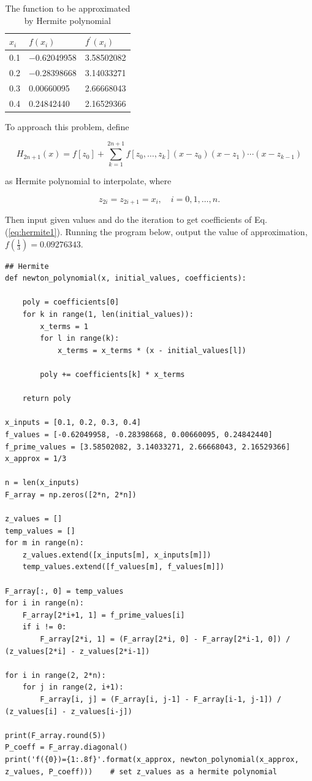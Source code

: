 \documentclass[preprint,12pt]{elsarticle}
\begin{document}
\begin{table}[h]
\centering
\begin{tabular}{l|l|l}
\textbf{$x_i$} & \textbf{$f(x_i)$} & \textbf{$f^{'}(x_i)$}\\
\hline
0.1 & −0.62049958 & 3.58502082 \\
0.2 & −0.28398668 & 3.14033271 \\
0.3 & 0.00660095 & 2.66668043 \\
0.4 & 0.24842440 & 2.16529366
\end{tabular}
\caption{The function to be approximated by Hermite polynomial}
\label{tab:hermite1}
\end{table}

To approach this problem, define 

\begin{equation}
\label{eq:hermite1}
    H_{2n+1}(x)=f[z_0]+\sum_{k=1}^{2n+1} {f[z_{0},\dots,z_{k}](x-z_0)(x-z_1)\cdots(x-z_{k-1})}
\end{equation}

as Hermite polynomial to interpolate, where

\begin{equation}
\label{eq:hermite2}
    z_{2i}=z_{2i+1}=x_i, \quad i=0,1,\dots,n.
\end{equation}

Then input given values and do the iteration to get coefficients of Eq. (\ref{eq:hermite1}). Running the program below, output the value of approximation, $f(\frac{1}{3})=0.09276343$.

\begin{lstlisting}
## Hermite
def newton_polynomial(x, initial_values, coefficients):
    
    poly = coefficients[0]
    for k in range(1, len(initial_values)):
        x_terms = 1
        for l in range(k):
            x_terms = x_terms * (x - initial_values[l])
        
        poly += coefficients[k] * x_terms
    
    return poly

x_inputs = [0.1, 0.2, 0.3, 0.4]
f_values = [-0.62049958, -0.28398668, 0.00660095, 0.24842440]
f_prime_values = [3.58502082, 3.14033271, 2.66668043, 2.16529366]
x_approx = 1/3

n = len(x_inputs)
F_array = np.zeros([2*n, 2*n])

z_values = []
temp_values = []
for m in range(n):
    z_values.extend([x_inputs[m], x_inputs[m]])
    temp_values.extend([f_values[m], f_values[m]])

F_array[:, 0] = temp_values
for i in range(n):
    F_array[2*i+1, 1] = f_prime_values[i]
    if i != 0:
        F_array[2*i, 1] = (F_array[2*i, 0] - F_array[2*i-1, 0]) / (z_values[2*i] - z_values[2*i-1])

for i in range(2, 2*n):
    for j in range(2, i+1):
        F_array[i, j] = (F_array[i, j-1] - F_array[i-1, j-1]) / (z_values[i] - z_values[i-j])

print(F_array.round(5))
P_coeff = F_array.diagonal()
print('f({0})={1:.8f}'.format(x_approx, newton_polynomial(x_approx, z_values, P_coeff)))    # set z_values as a hermite polynomial
\end{lstlisting}
\end{document}
